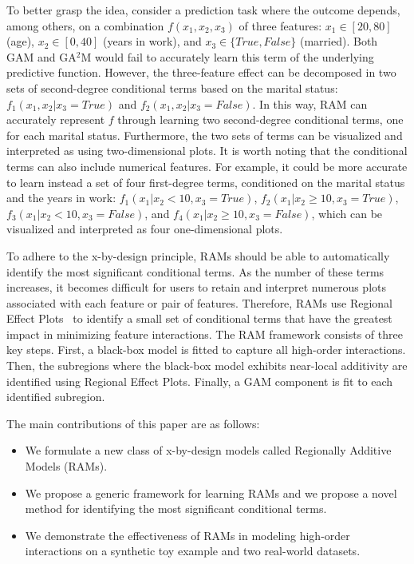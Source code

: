 \documentclass[runningheads]{llncs}
\begin{document}
To better grasp the idea, consider a prediction task where the outcome depends, among others,
on a combination $f(x_1, x_2, x_3)$ of three features:
$x_1 \in [20, 80]$ (age), $x_2 \in [0, 40]$ (years in work), and $x_3 \in \{True, False\}$ (married).
Both GAM and GA$^2$M would fail to accurately learn this term of the underlying predictive function.
However, the three-feature effect can be decomposed in two sets of second-degree conditional terms based
on the marital status: $f_{1}(x_1, x_2 | x_3 = True)$ and $f_{2}(x_1, x_2 | x_3 = False)$.
In this way, RAM can accurately represent $f$ through learning two second-degree conditional terms, one for each marital status.
Furthermore, the two sets of terms can be visualized and interpreted as using two-dimensional plots.
It is worth noting that the conditional terms can also include numerical features.
For example, it could be more accurate to learn instead a set of four first-degree terms, conditioned on the marital status and the years in work:
$f_{1}(x_1 | x_2 < 10, x_3 = True)$,
$f_{2}(x_1 | x_2 \geq 10, x_3 = True)$,
$f_{3}(x_1 | x_2 < 10, x_3 = False)$, and
$f_{4}(x_1 | x_2 \geq 10, x_3 = False)$, which can be visualized and interpreted as four one-dimensional plots.

To adhere to the x-by-design principle, RAMs should be able to automatically identify the
most significant conditional terms.
As the number of these terms increases, it becomes difficult for users to retain and interpret numerous plots
associated with each feature or pair of features.
Therefore, RAMs use Regional Effect Plots~\citep{herbinger2023decomposing} to identify a small set
of conditional terms that have the greatest impact in minimizing feature interactions.
The RAM framework consists of three key steps.
First, a black-box model is fitted to capture all high-order interactions.
Then, the subregions where the black-box model exhibits near-local additivity are identified using Regional Effect Plots.
Finally, a GAM component is fit to each identified subregion.

The main contributions of this paper are as follows:

\begin{itemize}
    \item We formulate a new class of x-by-design models called Regionally Additive Models (RAMs).
    \item We propose a generic framework for learning RAMs and we propose a novel method for identifying the most significant conditional terms.
    \item We demonstrate the effectiveness of RAMs in modeling high-order interactions on a synthetic toy example and two real-world datasets.
\end{itemize}
\end{document}
